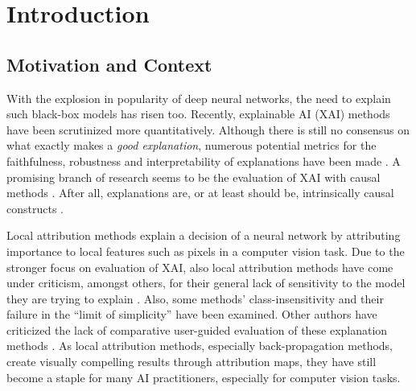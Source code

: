 \chapter{Introduction}\label{chapter:introduction}

\section{Motivation and Context}
With the explosion in popularity of deep neural networks, the need to explain such black-box models has risen too. Recently, explainable AI (XAI) methods have been scrutinized more quantitatively. Although there is still no consensus on what exactly makes a \textit{good explanation}, numerous potential metrics for the faithfulness, robustness and interpretability of explanations have been made \citep{Nauta2023}. A promising branch of research seems to be the evaluation of XAI with causal methods \citep{Moraffah2020a}. After all, explanations are, or at least should be, intrinsically causal constructs \citep{Woodward2004, Halpern2005, Schoelkopf2019}.

Local attribution methods explain a decision of a neural network by attributing importance to local features such as pixels in a computer vision task. 
Due to the stronger focus on evaluation of XAI, also local attribution methods have come under criticism, amongst others, for their general lack of sensitivity to the model they are trying to explain \citep{Adebayo2018, Karimi2023}. Also, some methods' class-insensitivity \citep{Sixt2020} and their failure in the ``limit of simplicity'' \citep{Wilming2023} have been examined. Other authors have criticized the lack of comparative user-guided evaluation of these explanation methods \citep{Rong2023}. 
As local attribution methods, especially back-propagation methods, create visually compelling results through attribution maps, they have still become a staple for many AI practitioners, especially for computer vision tasks.  


